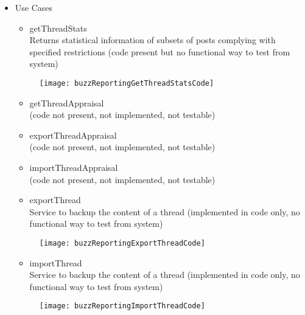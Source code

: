 \begin {itemize}
\item Use Cases
\begin {itemize}
\item {getThreadStats}\\ 
Returns statistical information of subsets of posts complying with specified restrictions (code present but no functional way to test from system)\\
\end {itemize}

\begin{figure}[h!]
  \centering
    \texttt{[image: buzzReportingGetThreadStatsCode]} 
\end{figure}

\begin {itemize}
\item {getThreadAppraisal}\\ 
 (code not present, not implemented, not testable) \\ 
\end {itemize}

\begin {itemize}
\item {exportThreadAppraisal}\\ 
 (code not present, not implemented, not testable) \\ 
\end {itemize}

\begin {itemize}
\item {importThreadAppraisal}\\ 
 (code not present, not implemented, not testable) \\ 
\end {itemize}


\begin {itemize}
\item {exportThread}\\ 
Service to backup the content of a thread (implemented in code only, no functional way to test from system) \\ 
\end {itemize}

\begin{figure}[h!]
  \centering
    \texttt{[image: buzzReportingExportThreadCode]} 
\end{figure}

\begin {itemize}
\item {importThread}\\ 
Service to backup the content of a thread (implemented in code only, no functional way to test from system) \\ 
\end {itemize}

\begin{figure}[h!]
  \centering
    \texttt{[image: buzzReportingImportThreadCode]} 
\end{figure}



\end {itemize}
